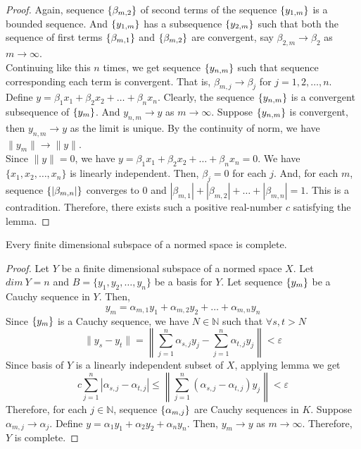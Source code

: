 \begin{proof}
	Again, sequence $\left\{\beta_{m,2}\right\}$ of second terms of the sequence $\left\{y_{1,m}\right\}$ is a bounded sequence.
	And $\left\{y_{1,m}\right\}$ has a subsequence $\left\{y_{2,m}\right\}$ such that both the sequence of first terms $\left\{\beta_{m,1}\right\}$ and $\left\{\beta_{m,2}\right\}$ are convergent, say $\beta_{2,m} \to \beta_2$ as $m \to \infty$.\\

	Continuing like this $n$ times, we get sequence $\left\{y_{n,m}\right\}$ such that sequence corresponding each term is convergent.
	That is, $\beta_{m,j} \to \beta_j$ for $j=1,2,\dots,n$.\\

	Define $y = \beta_1 x_1 + \beta_2 x_2 + \dots + \beta_n x_n$.
	Clearly, the sequence $\left\{y_{n,m}\right\}$ is a convergent subsequence of $\left\{y_m\right\}$.
	And $y_{n,m} \to y$ as $m \to \infty$.
	Suppose $\left\{y_{n,m}\right\}$ is convergent, then $y_{n,m} \to y$ as the limit is unique.
	By the continuity of norm, we have $\| y_m \| \to \| y \|$.\\

	Since $\| y \| = 0$, we have $y = \beta_1 x_1 + \beta_2 x_2 + \dots + \beta_n x_n = 0$.
	We have $\{ x_1, x_2, \dots, x_n \}$ is linearly independent.
	Then, $\beta_j = 0$ for each $j$.
	And, for each $m$, sequence $\left\{|\beta_{m,n} |\right\}$ converges to $0$ and $|\beta_{m,1}|+|\beta_{m,2}|+\dots+|\beta_{m,n}| = 1$.
	This is a contradition.
	Therefore, there exists such a positive real-number $c$ satisfying the lemma.
\end{proof}
\begin{theorem}
	Every finite dimensional subspace of a normed space is complete.
\end{theorem}
\begin{proof}
	Let $Y$ be a finite dimensional subspace of a normed space $X$.
	Let $dim\ Y = n$ and $B = \{ y_1, y_2, \dots, y_n \}$ be a basis for $Y$.
	Let sequence $\left\{y_m\right\}$ be a Cauchy sequence in $Y$.
	Then,
	\[ y_m = \alpha_{m,1} y_1 + \alpha_{m,2} y_2 + \dots + \alpha_{m,n} y_n \]
	Since $\left\{y_m\right\}$ is a Cauchy sequence, we have $N \in \mathbb{N}$ such that $\forall s,t > N$
	\[ \| y_s - y_t \| = \left\| \sum_{j=1}^n \alpha_{s,j} y_j - \sum_{j=1}^n \alpha_{t,j} y_j \right\| < \varepsilon \]
	Since basis of $Y$ is a linearly independent subset of $X$, applying lemma we get
	\[ c \sum_{j=1}^n \left|\alpha_{s,j} - \alpha_{t,j} \right| \le \left \| \sum_{j=1}^n (\alpha_{s,j}-\alpha_{t,j}) y_j \right\| < \varepsilon \]
	Therefore, for each $j \in \mathbb{N}$, sequence $\left\{\alpha_{m,j}\right\}$ are Cauchy sequences in $K$.
	Suppose $\alpha_{m,j} \to \alpha_j$.
	Define $y = \alpha_1 y_1 + \alpha_2 y_2 + \alpha_n y_n$.
	Then, $y_m \to y$ as $m \to \infty$.
	Therefore, $Y$ is complete.
\end{proof}

